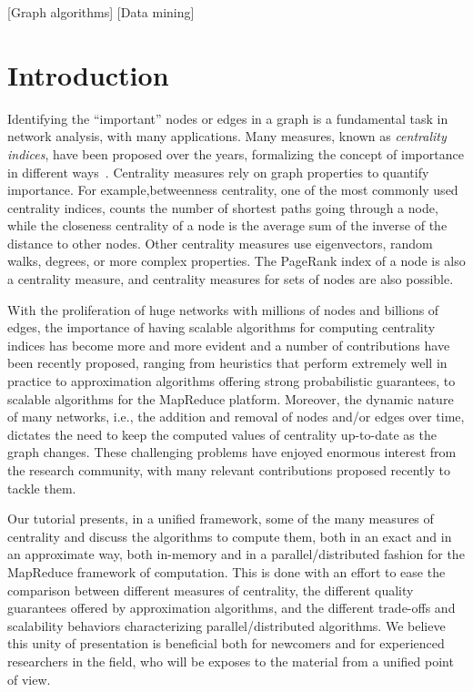 \documentclass[pdfpagelabels=false]{sig-alternate-2013} %
\begin{document}
[Graph algorithms]
[Data mining]


\section{Introduction}
Identifying the ``important'' nodes or edges in a graph is a fundamental task
in network analysis, with many applications. Many measures, known as
\emph{centrality indices}, have been proposed over the years, formalizing the
concept of importance in different ways~\citep{Newman10}. Centrality measures
rely on graph properties to quantify importance. For example,betweenness
centrality, one of the most commonly used centrality indices, counts the number
of shortest paths going through a node, while the closeness centrality of a node
is the average sum of the inverse of the distance to other nodes. Other
centrality measures use eigenvectors, random walks, degrees, or more complex
properties. The PageRank index of a node is also a centrality measure, and
centrality measures for sets of nodes are also possible.

With the proliferation of huge networks with millions of nodes and billions of
edges, the importance of having scalable algorithms for computing centrality
indices has become more and more evident and a number of contributions have been
recently proposed, ranging from heuristics that perform extremely well in
practice to approximation algorithms offering strong probabilistic guarantees,
to scalable algorithms for the MapReduce platform. Moreover, the dynamic nature
of many networks, i.e., the addition and removal of nodes and/or edges over
time, dictates the need to keep the computed values of centrality up-to-date as
the graph changes. These challenging problems have enjoyed enormous interest
from the research community, with many relevant contributions proposed recently
to tackle them.

Our tutorial presents, in a unified framework, some of the many measures of
centrality and discuss the algorithms to compute them, both in an exact and in
an approximate way, both in-memory and in a parallel/distributed fashion for the
MapReduce framework of computation. This is done with an effort to ease the
comparison between different measures of centrality, the different quality
guarantees offered by approximation algorithms, and the different trade-offs and
scalability behaviors characterizing parallel/distributed algorithms. We believe
this unity of presentation is beneficial both for newcomers and for
experienced researchers in the field, who will be exposes to the material from a
unified point of view.
\end{document}
